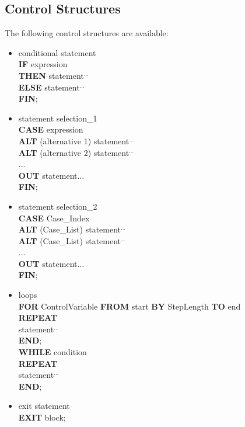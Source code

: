\begin{tobedone}
\section{Control Structures}   %

The following control structures are available:

\begin{itemize}
\item conditional statement\\

      {\bf IF} expression\\
      {\bf THEN} statement$^{...}$\\
      {\bf ELSE} statement$^{...}$\\
      {\bf FIN};

\item statement selection\_1\\

      {\bf CASE} expression\\
      {\bf ALT} (alternative 1) statement$^{...}$\\
      {\bf ALT} (alternative 2) statement$^{...}$\\
      ...\\
      {\bf OUT} statement${...}$\\
      {\bf FIN};

\item statement selection\_2\\

      {\bf CASE} Case\_Index\\
      {\bf ALT} (Case\_List) statement$^{...}$\\
      {\bf ALT} (Case\_List) statement$^{...}$\\
      ...\\
      {\bf OUT} statement${...}$\\
      {\bf FIN};

\item loops\\

      {\bf FOR} ControlVariable {\bf FROM} start {\bf BY} StepLength {\bf TO} end\\
      {\bf REPEAT}\\
      statement$^{...}$\\
      {\bf END};\\

      {\bf WHILE} condition\\
      {\bf REPEAT}\\
      statement$^{...}$\\
      {\bf END};

\item exit statement\\

      {\bf EXIT} block;
\end{itemize}
\end{tobedone}

